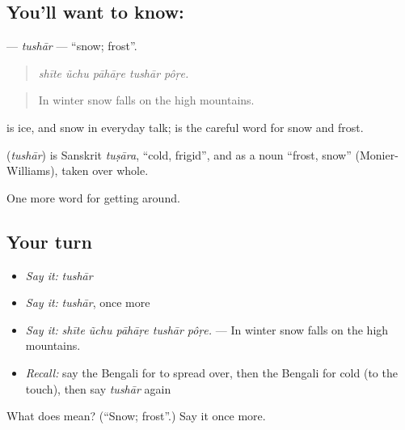 \subsection*{You'll want to know: }
\textbf{} — \emph{tushār} — \textquotedblleft{}snow; frost\textquotedblright{}.

\begin{quote}
    
\end{quote}

\begin{quote}
\emph{shīte ũchu pāhāṛe tushār pôṛe.}
\end{quote}

\begin{quote}
In winter snow falls on the high mountains.
\end{quote}

 is ice, and snow in everyday talk;  is the careful word for snow and frost.

\begin{cousinweb}
\textbf{} (\emph{tushār}) is Sanskrit \emph{tuṣāra}, \textquotedblleft{}cold, frigid\textquotedblright{}, and as a noun \textquotedblleft{}frost, snow\textquotedblright{} (Monier-Williams), taken over whole.
\end{cousinweb}

\begin{grammarlens}[title={What you've built}]
One more word for getting around.
\end{grammarlens}

\subsection*{Your turn}
\begin{itemize}
\raggedright
  \item \emph{Say it:} \emph{tushār}
  \item \emph{Say it:} \emph{tushār}, once more
  \item \emph{Say it:} \emph{shīte ũchu pāhāṛe tushār pôṛe.} — In winter snow falls on the high mountains.
  \item \emph{Recall:} say the Bengali for to spread over, then the Bengali for cold (to the touch), then say \emph{tushār} again
\end{itemize}

\begin{tcolorbox}[breakable,colback=teal!4,colframe=teal!35!black,title={Before you move on}]
What does  mean? (\textquotedblleft{}Snow; frost\textquotedblright{}.) Say it once more.
\end{tcolorbox}
